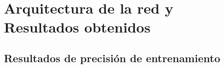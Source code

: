 
\chapter{Arquitectura de la red y Resultados obtenidos} %

\label{AppendA} %



\section{Resultados de precisión de entrenamiento}

